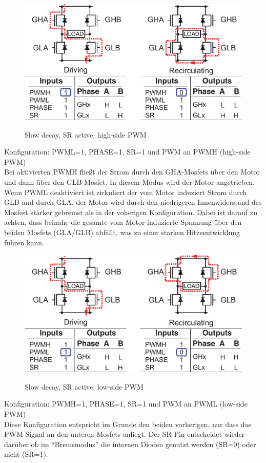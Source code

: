 \begin{figure}[H]
\centering
\includegraphics[width=.8\textwidth]{3941_2.png}\\
\caption{Slow decay, SR active, high-side PWM}%
\label{fig:39412}
\end{figure}

Konfiguration: PWML=1, PHASE=1, SR=1 und PWM an PWMH (high-side PWM)\\
Bei aktivierten PWMH fließt der Strom durch den GHA-Mosfets über den Motor und
dann über den GLB-Mosfet. In diesem Modus wird der Motor angetrieben.
Wenn PWML deaktiviert ist zirkuliert der vom Motor induziert Strom durch 
GLB und durch GLA, der Motor wird durch den niedrigeren Innenwiderstand des Mosfest 
stärker gebremst als in der voherigen Konfiguration. Dabei ist darauf zu achten, dass
beinahe die gesamte vom Motor induzierte Spannung über den beiden Mosfets (GLA/GLB) abfällt,
was zu einer starken Hitzeentwicklung führen kann.



\begin{figure}[H]
\centering
\includegraphics[width=.8\textwidth]{3941_3.png}\\
\caption{Slow decay, SR active, low-side PWM}%
\label{fig:39413}
\end{figure}

Konfiguration: PWMH=1, PHASE=1, SR=1 und PWM an PWML (low-side PWM)\\
Diese Konfiguration entspricht im Grunde den beiden vorherigen, nur dass das PWM-Signal
an den unteren Mosfets anliegt. Der SR-Pin entscheidet wieder darüber ob im ``Bremsmodus''
die internen Dioden genutzt werden (SR=0) oder nicht (SR=1).




